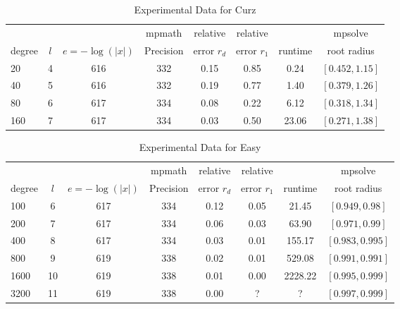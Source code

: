 \documentclass[sigconf]{acmart}
\begin{document}
\begin{table}[t]
\caption{Experimental Data for Curz}
\label{tab:curz}
\vskip -0.15in
\begin{center}
\begin{small}
\begin{sc}
\begin{tabular}{lccccccc}
\toprule
             &       &                       & mpmath   & relative       & relative       &               & mpsolve \\
degree  & $l$ & $e=-\log(|x|)$ & Precision & error $r_d$ & error $r_1$ & runtime & root radius\\
\midrule
   20 & 4 & 616 & 332 & 0.15 & 0.85 & 0.24   & $[0.452, 1.15]$ \\
   40 & 5 & 616 & 332 & 0.19 & 0.77 & 1.40   & $[0.379, 1.26]$\\
   80 & 6 & 617 & 334 & 0.08 & 0.22 & 6.12   & $[0.318, 1.34]$\\
 160 & 7 & 617 & 334 & 0.03 & 0.50 & 23.06 & $[0.271, 1.38]$\\
\bottomrule
\end{tabular}
\end{sc}
\end{small}
\end{center}
\vskip 0.05in
\end{table}

\begin{table}[t]
\caption{Experimental Data for Easy}
\label{tab:easy}
\vskip -0.15in
\begin{center}
\begin{small}
\begin{sc}
\begin{tabular}{lccccccc}
\toprule
&  &  & mpmath & relative  & relative &  & mpsolve \\
degree  & $l$& $e=-\log(|x|)$& Precision &error $r_d$       & error $r_1$ &runtime& root radius\\
\midrule
  100 & 6 & 617 & 334 & 0.12 & 0.05 &   21.45 & $[0.949, 0.98]$ \\
  200 & 7 & 617 & 334 & 0.06 & 0.03 &   63.90 & $[0.971, 0.99]$\\
  400 & 8 & 617 & 334 & 0.03 & 0.01 & 155.17 & $[0.983, 0.995]$\\
  800 & 9 & 619 & 338 & 0.02 & 0.01 & 529.08 & $[0.991, 0.991]$\\
1600 &10& 619 & 338 & 0.01 & 0.00 & 2228.22 & $[0.995, 0.999]$\\
3200 &11& 619 & 338 & 0.00 & ? & ? & $[0.997, 0.999]$\\
\bottomrule
\end{tabular}
\end{sc}
\end{small}
\end{center}
\vskip 0.05in
\end{table}
\end{document}
